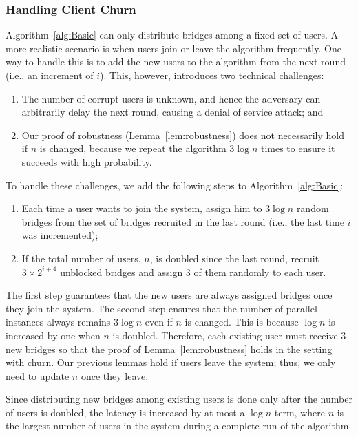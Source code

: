 \documentclass[letterpaper,twocolumn,10pt]{article}
\newcommand{\ie}{i.e.}
\begin{document}
\subsubsection{Handling Client Churn} \label{sec:churn}
Algorithm~\ref{alg:Basic} can only distribute bridges among a fixed set of users. A more realistic scenario is when users join or leave the algorithm frequently. One way to handle this is to add the new users to the algorithm from the next round (\ie, an increment of $i$). This, however, introduces two technical challenges: 
\begin{enumerate}[itemsep=0.5em, topsep=0.6em]
	\item The number of corrupt users is unknown, and hence the adversary can arbitrarily delay the next round, causing a denial of service attack; and
	
	\item Our proof of robustness (Lemma~\ref{lem:robustness}) does not necessarily hold if $n$ is changed, because we repeat the algorithm $3\log{n}$ times to ensure it succeeds with high probability. 
\end{enumerate}

\noindent To handle these challenges, we	 add the following steps to Algorithm~\ref{alg:Basic}:

\begin{enumerate}[itemsep=0.5em, topsep=0.6em]
	\item Each time a user wants to join the system, assign him to $3\log{n}$ random bridges from the set of bridges recruited in the last round (\ie, the last time $i$ was incremented);
	
	\item If the total number of users, $n$, is doubled since the last round, recruit $3 \times 2^{i+4}$ unblocked bridges and assign $3$ of them randomly to each user.
\end{enumerate}

The first step guarantees that the new users are always assigned bridges once they join the system. The second step ensures that the number of parallel instances always remains $3\log{n}$ even if $n$ is changed. This is because $\log{n}$ is increased by one when $n$ is doubled. Therefore, each existing user must receive $3$ new bridges so that the proof of Lemma~\ref{lem:robustness} holds in the setting with churn. Our previous lemmas hold if users leave the system; thus, we only need to update $n$ once they leave.

Since distributing new bridges among existing users is done only after the number of users is doubled, the latency is increased by at most a $\log{n}$ term, where $n$ is the largest number of users in the system during a complete run of the algorithm.
\end{document}
